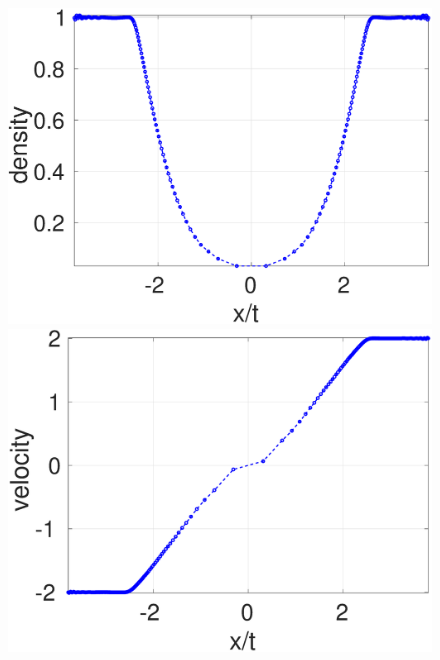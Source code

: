\begin{figure}
    \begin{minipage}{.495\textwidth}
        \centering
        \includegraphics[width=0.99 \textwidth]{Chapter-4/Figures/Sjogreen/Sjogreen-RCM-rho-Adpt1}
    \end{minipage}%
    \begin{minipage}{.495 \textwidth}
        \centering
        \includegraphics[width=0.99 \textwidth]{Chapter-4/Figures/Sjogreen/Sjogreen-RCM-v-Adpt1}
    \end{minipage}%
    \\
    \begin{minipage}{.495\textwidth}
        \centering

\end{minipage}
\end{figure}
